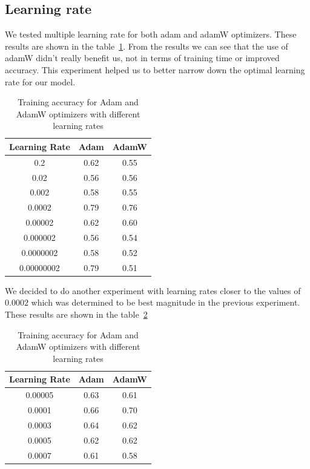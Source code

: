 \documentclass[12pt,a4paper,english
]{tunithesis}
\begin{document}
\subsection{Learning rate}
We tested multiple learning rate for both adam and adamW optimizers. These results are shown in the table~\ref{tab:learningrates}. From the results we can see that the use of adamW didn't really benefit us, not in terms of training time or improved accuracy. This experiment helped us to better narrow down the optimal learning rate for our model.
\begin{table}[h!]
\centering
\caption{Training accuracy for Adam and AdamW optimizers with different learning rates}
\begin{tabular}{|c|c|c|}
\hline
\textbf{Learning Rate} & \textbf{Adam} & \textbf{AdamW} \\ \hline
0.2 & 0.62 & 0.55 \\ \hline
0.02 & 0.56 & 0.56 \\ \hline
0.002 & 0.58 & 0.55 \\ \hline
0.0002 & 0.79 & 0.76 \\ \hline
0.00002 & 0.62 & 0.60 \\ \hline
0.000002 & 0.56 & 0.54 \\ \hline
0.0000002 & 0.58 & 0.52 \\ \hline
0.00000002 & 0.79 & 0.51 \\ \hline
\end{tabular}
\label{tab:learningrates}
\end{table}

We decided to do another experiment with learning rates closer to the values of $0.0002$ which was determined to be best magnitude in the previous experiment. These results are shown in the table~\ref{tab:learningrates2}

\begin{table}[h!]
\centering
\caption{Training accuracy for Adam and AdamW optimizers with different learning rates}
\begin{tabular}{|c|c|c|}
\hline
\textbf{Learning Rate} & \textbf{Adam} & \textbf{AdamW} \\ \hline
0.00005 & 0.63 & 0.61 \\ \hline
0.0001 & 0.66 & 0.70 \\ \hline
0.0003 & 0.64 & 0.62 \\ \hline
0.0005 & 0.62 & 0.62 \\ \hline
0.0007 & 0.61 & 0.58 \\ \hline
\end{tabular}
\label{tab:learningrates2}
\end{table}
\end{document}
